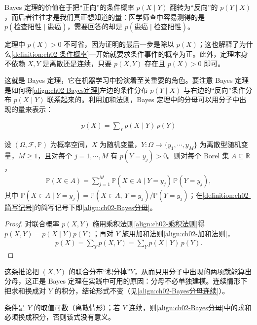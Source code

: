 \documentclass[../../main.tex]{subfiles}
\begin{document}
\begin{remark}
Bayes 定理的价值在于把“正向”的条件概率 $p(X\mid Y)$ 翻转为“反向”的 $p(Y\mid X)$，而后者往往才是我们真正想知道的量：医学筛查中容易测得的是 $p(\text{检查阳性}\mid\text{患癌})$，需要回答的却是 $p(\text{患癌}\mid\text{检查阳性})$。

定理中 $p(X)>0$ 不可省，因为证明的最后一步是除以 $p(X)$；这也解释了为什么\cref{definition:ch02-条件概率}一开始就要求条件事件的概率为正。此外，定理本身不依赖 $X,Y$ 是离散还是连续，只要 $p(X,Y)$ 存在且 $p(X)>0$ 即可。
\end{remark}

这就是 Bayes 定理，它在机器学习中扮演着至关重要的角色。要注意 Bayes 定理是如何将\eqref{align:ch02-Bayes定理}左边的条件分布 $p(Y\mid X)$ 与右边的“反向”条件分布 $p(X\mid Y)$ 联系起来的。利用加和法则，Bayes 定理中的分母可以用分子中出现的量来表示：

\begin{align}
  p(X) = \sum_{Y} p(X\mid Y)\,p(Y)
  \label{align:ch02-Bayes分母}
\end{align}

\begin{proposition}\label{proposition:ch02-Bayes分母}
设 $(\Omega,\mathcal{F},\mathbb{P})$ 为概率空间，$X$ 为随机变量，$Y:\Omega\to\{y_1,\cdots,y_M\}$ 为离散型随机变量，$M\geqslant1$，且对每个 $j=1,\cdots,M$ 有 $p(Y=y_j)>0$。则对每个 Borel 集 $A\subseteq\mathbb{R}$，
\begin{align*}
  \mathbb{P}(X\in A)=\sum_{j=1}^{M}\mathbb{P}(X\in A\mid Y=y_j)\,\mathbb{P}(Y=y_j),
\end{align*}
其中 $\mathbb{P}(X\in A\mid Y=y_j)=\mathbb{P}(X\in A,\ Y=y_j)/\mathbb{P}(Y=y_j)$；在\cref{definition:ch02-简写记号}的简写记号下即\eqref{align:ch02-Bayes分母}。
\end{proposition}

\begin{proof}
对联合概率 $p(X,Y)$ 施用乘积法则\eqref{align:ch02-乘积法则}得 $p(X,Y)=p(X\mid Y)p(Y)$；再对 $Y$ 施用加和法则\eqref{align:ch02-加和法则}，
\begin{align*}
 p(X) = \sum_{Y} p(X,Y) = \sum_{Y} p(X\mid Y)\,p(Y) .
\end{align*}
\end{proof}

\begin{remark}
这条推论把 $(X,Y)$ 的联合分布“积分掉”$Y$，从而只用分子中出现的两项就能算出分母，这正是 Bayes 定理在实践中可用的原因：分母不必单独建模。连续情形下把求和换成对 $Y$ 的积分，结论形式不变（见\eqref{align:ch02-Bayes分母连续}）。

条件是 $Y$ 的取值可数（离散情形）；若 $Y$ 连续，则\eqref{align:ch02-Bayes分母}中的求和必须换成积分，否则该式没有意义。
\end{remark}
\end{document}
